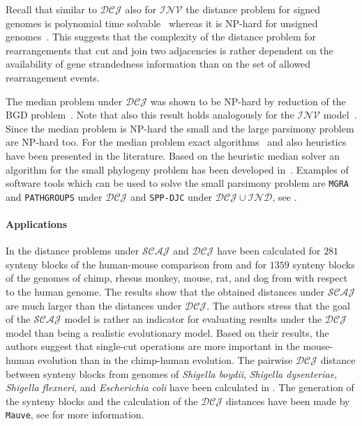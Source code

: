 \documentclass{svmult}
\newcommand{\m}[1]{\mathcal{#1}}
\begin{document}
Recall that similar to $\m{DCJ}$ also for $\m{INV}$ the distance problem for signed genomes is 
polynomial time solvable~\cite{Hannenhalli_1999} whereas it is NP-hard for unsigned genomes~\cite{Caprara_1997}. 
This suggests that the complexity of the distance problem for rearrangements that cut and join two adjacencies is 
rather dependent on the availability of gene strandedness information than on the set of allowed rearrangement events.

The median problem under $\m{DCJ}$ was shown to be NP-hard by reduction of 
the BGD problem~\cite{Tannier_2009}. Note that also this result holds analogously for the $\m{INV}$ model~\cite{Caprara_2003}. 
Since the median problem is NP-hard the small and the large parsimony problem are NP-hard too. 
For the median problem exact algorithms~\cite{Xu_2008,Zhang_2009} and also heuristics~\cite{Adam_2008,Lenne_2008} have been 
presented in the literature. 
Based on the heuristic median solver an algorithm for the small phylogeny problem has been developed in~\cite{Adam_2008}.
Examples of software tools which can be used to solve the small parsimony
problem are \texttt{MGRA} and \texttt{PATHGROUPS} under $\m{DCJ}$ and \texttt{SPP-DJC} under $\m{DCJ}\cup\m{IND}$, see .

\paragraph{Applications}
In \cite{Bergeron_2010} the distance problems under $\m{SCAJ}$ and
$\m{DCJ}$ have been calculated for $281$ synteny blocks of the human-mouse
comparison from \cite{Pevzner_2003} and for $1359$ synteny blocks of the genomes
of chimp, rhesus monkey, mouse, rat, and dog from \cite{Ma_2006} with respect to
the human genome. 
The results show that the obtained distances under $\m{SCAJ}$ are much
larger than the distances under $\m{DCJ}$. The authors stress that the goal of  
the $\m{SCAJ}$ model is rather an indicator for evaluating results under 
the $\m{DCJ}$ model than being a realistic evolutionary model. 
Based on their results, the authors suggest that
single-cut operations are more important in the mouse-human evolution than in 
the chimp-human evolution.
The pairwise $\m{DCJ}$ distance between synteny blocks from genomes of
\emph{Shigella boydii}, \emph{Shigella dysenteriae}, \emph{Shigella flexneri}, 
and \emph{Escherichia coli} have been calculated in \cite{Friedberg_2008}. The generation of the synteny blocks and the calculation
of the $\m{DCJ}$ distances have been made by \texttt{Mauve}, see
 for more information.
 
\end{document}
